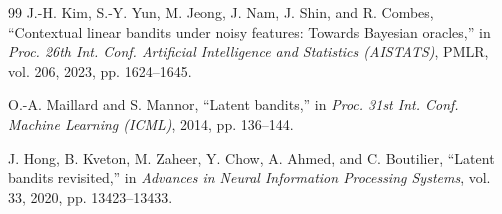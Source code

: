 \documentclass[conference]{IEEEtran}
\begin{document}
\begin{thebibliography}{99}
J.-H. Kim, S.-Y. Yun, M. Jeong, J. Nam, J. Shin, and R. Combes, ``Contextual linear bandits under noisy features: Towards Bayesian oracles,'' in \emph{Proc. 26th Int. Conf. Artificial Intelligence and Statistics (AISTATS)}, PMLR, vol. 206, 2023, pp. 1624--1645.

O.-A. Maillard and S. Mannor, ``Latent bandits,'' in \emph{Proc. 31st Int. Conf. Machine Learning (ICML)}, 2014, pp. 136--144.

J. Hong, B. Kveton, M. Zaheer, Y. Chow, A. Ahmed, and C. Boutilier, ``Latent bandits revisited,'' in \emph{Advances in Neural Information Processing Systems}, vol. 33, 2020, pp. 13423--13433.
\end{thebibliography}
\end{document}
